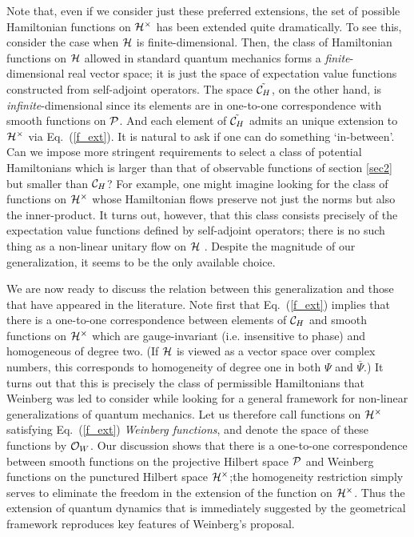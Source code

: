 Note that, even if we consider just these preferred extensions, the
set of possible Hamiltonian functions on $\punctH$ has been extended
quite dramatically.  To see this, consider the case when $\H$ is
finite-dimensional. Then, the class of Hamiltonian functions on $\H$
allowed in standard quantum mechanics forms a {\it finite}-dimensional
real vector space; it is just the space of expectation value functions
constructed from self-adjoint operators. The space $\tilde\ch$, on the
other hand, is {\it infinite}-dimensional since its elements are in
one-to-one correspondence with smooth functions on $\P$. And each
element of $\tilde\ch$ admits an unique extension to $\punctH$ via
Eq.~(\ref{f_ext}). It is natural to ask if one can do something
`in-between'. Can we impose more stringent requirements to select a
class of potential Hamiltonians which is larger than that of
observable functions of section \ref{sec2} but smaller than $\ch$?
For example, one might imagine looking for the class of functions on
$\punctH$ whose Hamiltonian flows preserve not just the norms but also
the inner-product. It turns out, however, that this class consists
precisely of the expectation value functions defined by self-adjoint
operators; there is no such thing as a non-linear unitary flow on $\H$
\cite{thesis}. Despite the magnitude of our generalization, it seems
to be the only available choice.

We are now ready to discuss the relation between this generalization
and those that have appeared in the literature. Note first that
Eq.~(\ref{f_ext}) implies that there is a one-to-one correspondence
between elements of $\ch$ and smooth functions on $\punctH$ which are
gauge-invariant (i.e. insensitive to phase) and homogeneous of degree
two. (If $\H$ is viewed as a vector space over complex numbers, this
corresponds to homogeneity of degree one in both $\Psi$ and
$\bar{\Psi}$.)  It turns out that this is precisely the class of
permissible Hamiltonians that Weinberg \cite{weinberg} was led to
consider while looking for a general framework for non-linear
generalizations of quantum mechanics. Let us therefore call functions
on $\punctH$ satisfying Eq.~(\ref{f_ext}) {\em Weinberg functions},
and denote the space of these functions by ${\cal O}_W$. Our
discussion shows that there is a one-to-one correspondence between
smooth functions on the projective Hilbert space $\P$ and Weinberg
functions on the punctured Hilbert space $\punctH$;the homogeneity
restriction simply serves to eliminate the freedom in the extension of
the function on $\punctH$.  Thus the extension of quantum dynamics
that is immediately suggested by the geometrical framework reproduces
key features of Weinberg's proposal.


